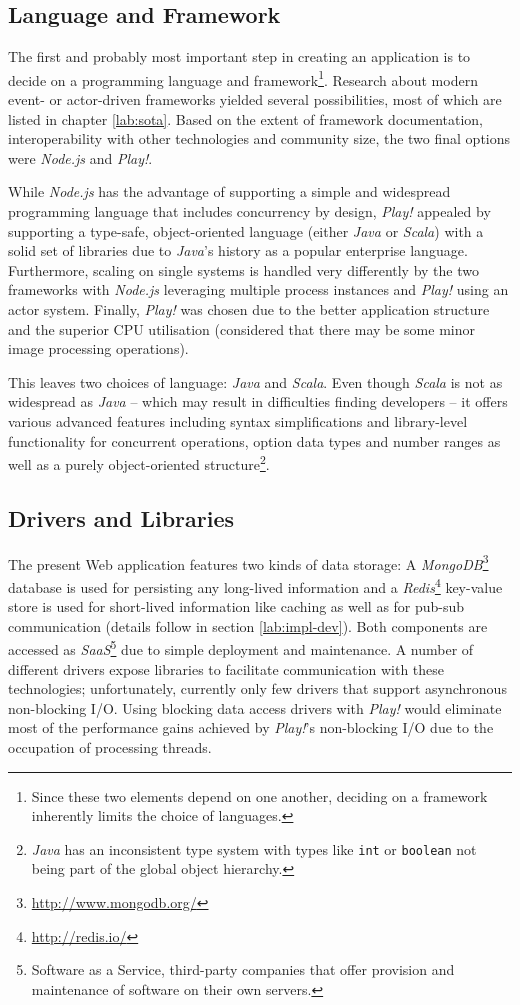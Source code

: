 \subsection{Language and Framework}
\label{lab:lang}
The first and probably most important step in creating an application is to decide on a programming language and framework\footnote{Since these two elements depend on one another, deciding on a framework inherently limits the choice of languages.}. Research about modern event- or actor-driven frameworks yielded several possibilities, most of which are listed in chapter \ref{lab:sota}. Based on the extent of framework documentation, interoperability with other technologies and community size, the two final options were \textit{Node.js} and \textit{Play!}. 

While \textit{Node.js} has the advantage of supporting a simple and widespread programming language that includes concurrency by design, \textit{Play!} appealed by supporting a type-safe, object-oriented language (either \textit{Java} or \textit{Scala}) with a solid set of libraries due to \textit{Java}'s history as a popular enterprise language. Furthermore, scaling on single systems is handled very differently by the two frameworks with \textit{Node.js} leveraging multiple process instances and \textit{Play!} using an actor system. Finally, \textit{Play!} was chosen due to the better application structure and the superior CPU utilisation (considered that there may be some minor image processing operations).

This leaves two choices of language: \textit{Java} and \textit{Scala}. Even though \textit{Scala} is not as widespread as \textit{Java} -- which may result in difficulties finding developers -- it offers various advanced features including syntax simplifications and library-level functionality for concurrent operations, option data types and number ranges as well as a purely object-oriented structure\footnote{\textit{Java} has an inconsistent type system with types like \texttt{int} or \texttt{boolean} not being part of the global object hierarchy.}. 

\subsection{Drivers and Libraries}
The present Web application features two kinds of data storage: A \textit{MongoDB}\footnote{\url{http://www.mongodb.org/}} database is used for persisting any long-lived information and a \textit{Redis}\footnote{\url{http://redis.io/}} key-value store is used for short-lived information like caching as well as for pub-sub communication (details follow in section \ref{lab:impl-dev}). Both components are accessed as \textit{SaaS}\footnote{Software as a Service, third-party companies that offer provision and maintenance of software on their own servers.} due to simple deployment and maintenance. A number of different drivers expose libraries to facilitate communication with these technologies; unfortunately, currently only few drivers that support asynchronous non-blocking I/O. Using blocking data access drivers with \textit{Play!} would eliminate most of the performance gains achieved by \textit{Play!}'s non-blocking I/O due to the occupation of processing threads. 

